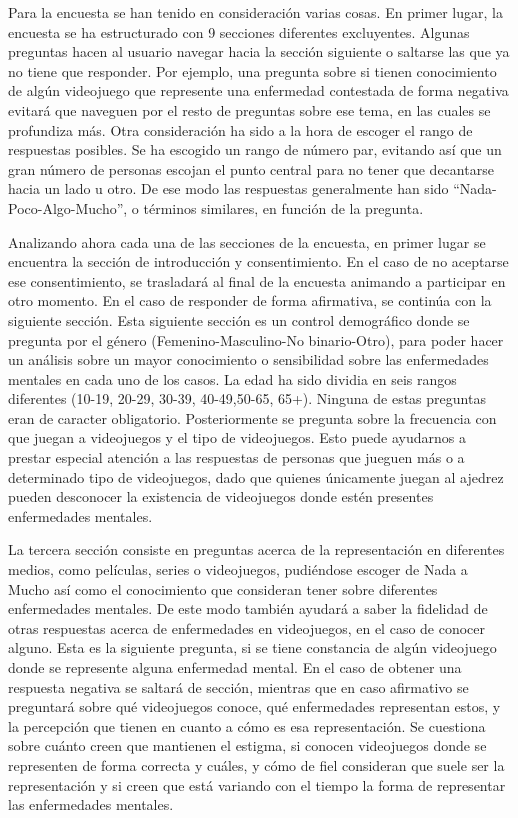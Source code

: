 \documentclass[12pt, a4paper,twoside,titlepage]{book}
\begin{document}
Para la encuesta se han tenido en consideración varias cosas. En primer lugar, la encuesta se ha estructurado con 9 secciones diferentes excluyentes. Algunas preguntas hacen al usuario navegar hacia la sección siguiente o saltarse las que ya no tiene que responder. Por ejemplo, una pregunta sobre si tienen conocimiento de algún videojuego que represente una enfermedad contestada de forma negativa evitará que naveguen por el resto de preguntas sobre ese tema, en las cuales se profundiza más. Otra consideración ha sido a la hora de escoger el rango de respuestas posibles. Se ha escogido un rango de número par, evitando así que un gran número de personas escojan el punto central para no tener que decantarse hacia un lado u otro. De ese modo las respuestas generalmente han sido ``Nada-Poco-Algo-Mucho'', o términos similares, en función de la pregunta. 

Analizando ahora cada una de las secciones de la encuesta, en primer lugar se encuentra la sección de introducción y consentimiento. En el caso de no aceptarse ese consentimiento, se trasladará al final de la encuesta animando a participar en otro momento. En el caso de responder de forma afirmativa, se continúa con la siguiente sección. Esta siguiente sección es un control demográfico donde se pregunta por el género (Femenino-Masculino-No binario-Otro), para poder hacer un análisis sobre un mayor conocimiento o sensibilidad sobre las enfermedades mentales en cada uno de los casos. La edad ha sido dividia en seis rangos diferentes (10-19, 20-29, 30-39, 40-49,50-65, 65+). Ninguna de estas preguntas eran de caracter obligatorio. Posteriormente se pregunta sobre la frecuencia con que juegan a videojuegos y el tipo de videojuegos. Esto puede ayudarnos a prestar especial atención a las respuestas de personas que jueguen más o a determinado tipo de videojuegos, dado que quienes únicamente juegan al ajedrez pueden desconocer la existencia de videojuegos donde estén presentes enfermedades mentales. 

La tercera sección consiste en preguntas acerca de la representación en diferentes medios, como películas, series o videojuegos, pudiéndose escoger de Nada a Mucho así como el conocimiento que consideran tener sobre diferentes enfermedades mentales. De este modo también ayudará a saber la fidelidad de otras respuestas acerca de enfermedades en videojuegos, en el caso de conocer alguno. Esta es la siguiente pregunta, si se tiene constancia de algún videojuego donde se represente alguna enfermedad mental. En el caso de obtener una respuesta negativa se saltará de sección, mientras que en caso afirmativo se preguntará sobre qué videojuegos conoce, qué enfermedades representan estos, y la percepción que tienen en cuanto a cómo es esa representación. Se cuestiona sobre cuánto creen que mantienen el estigma, si conocen videojuegos donde se representen de forma correcta y cuáles, y cómo de fiel consideran que suele ser la representación y si creen que está variando con el tiempo la forma de representar las enfermedades mentales. 
\end{document}
